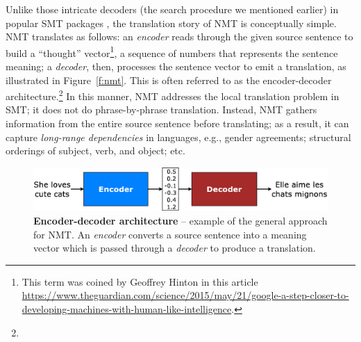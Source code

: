 {Unlike those intricate decoders (the search procedure we mentioned earlier) in popular SMT packages
\cite{koehn2007moses,chiang07hiero,dyer10cdec,cer10phrasal}, the translation
story of NMT is conceptually simple.
NMT translates as follows: an {\it encoder} reads through the given source
sentence to build a ``thought''
vector\footnote{This term was coined by Geoffrey Hinton in this article
\url{https://www.theguardian.com/science/2015/may/21/google-a-step-closer-to-developing-machines-with-human-like-intelligence}.},
a sequence of numbers that represents the sentence meaning; a {\it
decoder}, then, processes the sentence vector to emit a translation, as
illustrated in Figure~\ref{f:nmt}. 
This is often referred to as the encoder-decoder
architecture.\footnote{} In this manner, NMT addresses the
local translation problem in SMT; it does not do phrase-by-phrase translation.
Instead, NMT gathers information from the entire source sentence before translating; as a result,
it can capture {\it long-range dependencies} in languages, e.g., gender
agreements; structural orderings of subject, verb, and object; etc.
\begin{figure}[tbh!]
\centering
\includegraphics[width=\textwidth, clip=true, trim= 0 0 0 0]{img/encdec}
\caption[Encoder-decoder architecture]{{\bf Encoder-decoder architecture} --
example of the general approach for NMT. An {\it encoder} converts a source sentence
into a meaning vector which is passed through a {\it decoder} to produce a translation.
} 
\label{f:encdec}
\end{figure}


}
